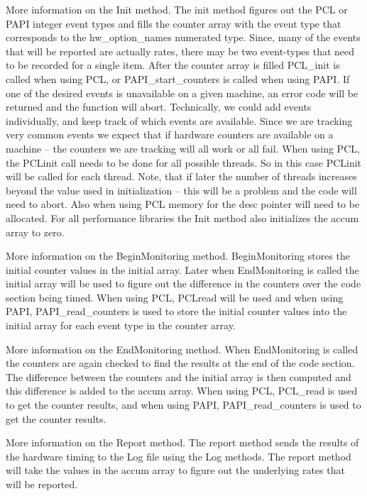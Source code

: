 More information on the Init method. The init method figures out the PCL or
PAPI integer event types and fills the counter array with the event type that
corresponds to the hw\_option\_names numerated type. Since, many of the events
that will be reported are actually rates, there may be two event-types that
need to be recorded for a single item. After the counter array is filled PCL\_init
is called when using PCL, or PAPI\_start\_counters is called when using PAPI.
If one of the desired events is unavailable on a given machine, an error
code will be returned and the function will abort. Technically, we could
add events individually, and keep track of which events are available. Since
we are tracking very common events we expect that if hardware counters are
available on a machine -- the counters we are tracking will all work or all fail.
When using PCL, the PCLinit call needs to be done for all possible threads.
So in this case PCLinit will be called for each thread. Note, that if later
the number of threads increases beyond the value used in initialization -- this
will be a problem and the code will need to abort. Also when using PCL memory
for the desc pointer will need to be allocated. For all performance libraries the 
Init method also initializes the accum array to zero.

More information on the BeginMonitoring method. BeginMonitoring stores the initial
counter values in the initial array. Later when EndMonitoring is called the initial
array will be used to figure out the difference in the counters over the code 
section being timed. When using PCL, PCLread will be used and when using PAPI, 
PAPI\_read\_counters is used to store the initial counter values into the initial array 
for each event type in the counter array.

More information on the EndMonitoring method. When EndMonitoring is called
the counters are again checked to find the results at the end of the code
section. The difference between the counters and the initial array is then
computed and this difference is added to the accum array. When using PCL,
PCL\_read is used to get the counter results, and when using PAPI, PAPI\_read\_counters
is used to get the counter results.

More information on the Report method. The report method sends the results
of the hardware timing to the Log file using the Log methods. The report method
will take the values in the accum array to figure out the underlying rates that
will be reported.


